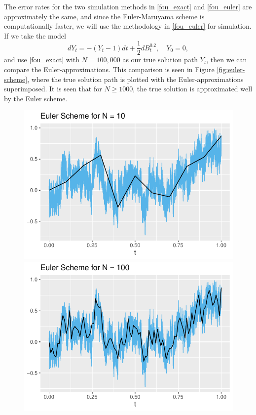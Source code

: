 The error rates for the two simulation methods in \eqref{fou_exact} and \eqref{fou_euler} are approximately the same, and since the Euler-Maruyama scheme is computationally faster, we will use the methodology in \eqref{fou_euler} for simulation. If we take the model 
\begin{equation}
    dY_{t}=-(Y_{t}-1)dt+\frac{1}{2}dB^{0.2}_{t},\quad Y_{0}=0,
\end{equation}
and use \eqref{fou_exact} with $N=100,000$ as our true solution path $Y_{t}$, then we can compare the Euler-approximations. This comparison is seen in Figure \ref{fig:euler-scheme}, where the true solution path is plotted with the Euler-approximations superimposed. It is seen that for $N\geq 1000$, the true solution is approximated well by the Euler scheme.
\begin{figure}[H]
    \centering
    \includegraphics[scale=0.58]{fig/img/EulerScheme/EulerScheme10.pdf}\hfill
    \includegraphics[scale=0.58]{fig/img/EulerScheme/EulerScheme100.pdf}\hfill

\end{figure}
